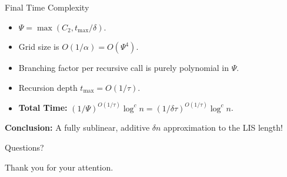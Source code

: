 \documentclass[11pt,aspectratio=169]{beamer}
\newcommand{\errorcont}{\Psi}
\begin{document}
\begin{frame}{Final Time Complexity}
    \begin{itemize}
        \item $\errorcont = \max(C_2, t_{\max}/\delta)$.
        \item Grid size is $O(1/\alpha) = O(\errorcont^4)$.
        \item Branching factor per recursive call is purely polynomial in $\errorcont$.
        \item Recursion depth $t_{\max} = O(1/\tau)$.
        \item \textbf{Total Time:} $(1/\errorcont)^{O(1/\tau)} \log^c n = (1/\delta\tau)^{O(1/\tau)} \log^c n$.
    \end{itemize}
    \vspace{0.5cm}
    \textbf{Conclusion:} A fully sublinear, additive $\delta n$ approximation to the LIS length!
\end{frame}

\begin{frame}
    \begin{center}
        \Huge Questions?
    \end{center}
    \vspace{1cm}
    \begin{center}
        \Large Thank you for your attention.
    \end{center}
\end{frame}
\end{document}
